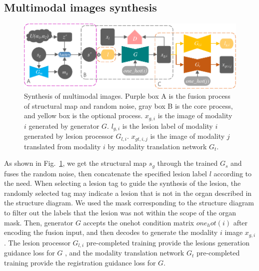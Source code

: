 \documentclass[runningheads]{llncs}
\begin{document}
\subsection{Multimodal images synthesis}
\begin{figure}
	\centering
	\includegraphics[width=1\columnwidth]{figures/mm_mri_generate_train}
	\caption{Synthesis of multimodal images. Purple box A is the fusion process of structural map and random noise, gray box B is the core process, and yellow box is the optional process. 
		$x_{g,i}$ is the image of modality $i$ generated by generator $G$. 
		$l_{g,i}$ is the lesion label of modality $i$ generated by lesion processor $G_{l,i}$.
		$x_{gt,i,j}$ is the image of modality $j$ translated from modality $i$ by modality translation network $G_t$.
	}
	\label{mm_mri_generate}
\end{figure}
As shown in Fig.~\ref{mm_mri_generate}, we get the structural map $s_g$ through the trained $G_s$ and fuses the random noise, then concatenate the specified lesion label $l$ according to the need. When selecting a lesion tag to guide the synthesis of the lesion, the randomly selected tag may indicate a lesion that is not in the organ described in the structure diagram. We used the mask corresponding to the structure diagram to filter out the labels that the lesion was not within the scope of the organ mask. Then, generator $G$ accepts the onehot condition matrix $one_hot(i)$ after encoding the fusion input, and then decodes to generate the modality $i$ image $x_{g,i}$. The lesion processor $G_{l,i}$ pre-completed training provide the lesions generation guidance loss for $G$ , and the modality translation network $G_t$ pre-completed training provide the registration guidance loss for $G$.
\end{document}
